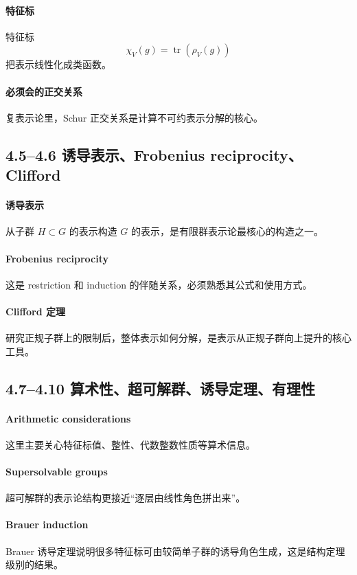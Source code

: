 \documentclass[a4paper]{ctexart}
\begin{document}
\paragraph{特征标}
特征标
\[
\chi_V(g)=\operatorname{tr}(\rho_V(g))
\]
把表示线性化成类函数。

\paragraph{必须会的正交关系}
复表示论里，Schur 正交关系是计算不可约表示分解的核心。

\subsection{4.5--4.6 诱导表示、Frobenius reciprocity、Clifford}

\paragraph{诱导表示}
从子群 \(H\subset G\) 的表示构造 \(G\) 的表示，是有限群表示论最核心的构造之一。

\paragraph{Frobenius reciprocity}
这是 restriction 和 induction 的伴随关系，必须熟悉其公式和使用方式。

\paragraph{Clifford 定理}
研究正规子群上的限制后，整体表示如何分解，是表示从正规子群向上提升的核心工具。

\subsection{4.7--4.10 算术性、超可解群、诱导定理、有理性}

\paragraph{Arithmetic considerations}
这里主要关心特征标值、整性、代数整数性质等算术信息。

\paragraph{Supersolvable groups}
超可解群的表示论结构更接近“逐层由线性角色拼出来”。

\paragraph{Brauer induction}
Brauer 诱导定理说明很多特征标可由较简单子群的诱导角色生成，这是结构定理级别的结果。
\end{document}
